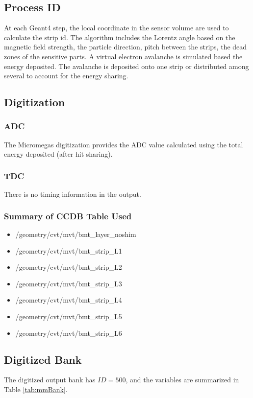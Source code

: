 \subsection{Process ID}
At each Geant4 step, the local coordinate in the sensor volume are used to calculate the strip id.
The algorithm includes the Lorentz angle based on the magnetic field strength, the particle direction, pitch between the strips,
the dead zones of the sensitive parts. A virtual electron avalanche is simulated based the energy deposited. The avalanche
is deposited onto one strip or distributed among several to account for the energy sharing.



\subsection{Digitization}

\subsubsection{ADC}
The Micromegas digitization provides the ADC value calculated using the total energy deposited (after hit sharing).


\subsubsection{TDC}
There is no timing information in the output.

\subsubsection{Summary of CCDB Table Used}

\begin{itemize}
	\item /geometry/cvt/mvt/bmt\_layer\_noshim
	\item /geometry/cvt/mvt/bmt\_strip\_L1
	\item /geometry/cvt/mvt/bmt\_strip\_L2
	\item /geometry/cvt/mvt/bmt\_strip\_L3
	\item /geometry/cvt/mvt/bmt\_strip\_L4
	\item /geometry/cvt/mvt/bmt\_strip\_L5
	\item /geometry/cvt/mvt/bmt\_strip\_L6
\end{itemize}


\subsection{Digitized Bank}
The digitized output bank has $ID=500$, and the variables are summarized in Table \ref{tab:mmBank}.

